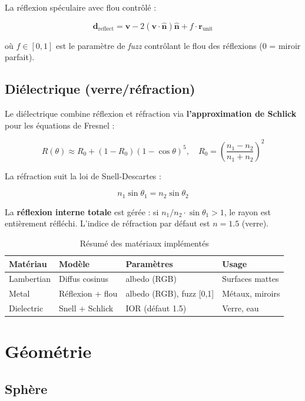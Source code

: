 \documentclass[12pt,a4paper]{article}
\begin{document}
La réflexion spéculaire avec flou contrôlé :

\[
\bm{d}_{\text{reflect}} = \bm{v} - 2(\bm{v} \cdot \hat{\bm{n}})\hat{\bm{n}} + f \cdot \bm{r}_{\text{unit}}
\]

où $f \in [0,1]$ est le paramètre de \textit{fuzz} contrôlant le flou des
réflexions (0 = miroir parfait).

\subsection{Diélectrique (verre/réfraction)}

Le diélectrique combine réflexion et réfraction via \textbf{l'approximation de Schlick}
pour les équations de Fresnel :

\[
R(\theta) \approx R_0 + (1 - R_0)(1 - \cos\theta)^5, \quad R_0 = \left(\frac{n_1 - n_2}{n_1 + n_2}\right)^2
\]

La réfraction suit la loi de Snell-Descartes :

\[
n_1 \sin\theta_1 = n_2 \sin\theta_2
\]

La \textbf{réflexion interne totale} est gérée : si $n_1/n_2 \cdot \sin\theta_1 > 1$,
le rayon est entièrement réfléchi. L'indice de réfraction par défaut est $n = 1.5$
(verre).

\begin{table}[H]
\centering
\begin{tabular}{llll}
\toprule
\textbf{Matériau} & \textbf{Modèle} & \textbf{Paramètres} & \textbf{Usage} \\
\midrule
Lambertian  & Diffus cosinus    & albedo (RGB)              & Surfaces mattes \\
Metal       & Réflexion + flou  & albedo (RGB), fuzz [0,1]  & Métaux, miroirs \\
Dielectric  & Snell + Schlick   & IOR (défaut 1.5)          & Verre, eau \\
\bottomrule
\end{tabular}
\caption{Résumé des matériaux implémentés}
\end{table}

\section{Géométrie}

\subsection{Sphère}
\end{document}
